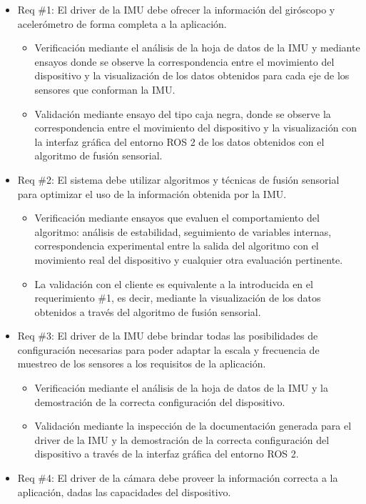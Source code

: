 \documentclass[
11pt, %
codirector, %
]{charter}
\begin{document}
\begin{itemize}
	\item Req \#1: El driver de la IMU debe ofrecer la información del giróscopo y acelerómetro de forma completa a la aplicación.
	\begin{itemize}
		\item Verificación mediante el análisis de la hoja de datos de la IMU y mediante ensayos donde se observe la correspondencia entre el movimiento del dispositivo y la visualización de los datos obtenidos para cada eje de los sensores que conforman la IMU.
		\item Validación mediante ensayo del tipo caja negra, donde se observe la correspondencia entre el movimiento del dispositivo y la visualización con la interfaz gráfica del entorno ROS 2 de los datos obtenidos con el algoritmo de fusión sensorial.
	\end{itemize}
	\item Req \#2: El sistema debe utilizar algoritmos y técnicas de fusión sensorial para optimizar el uso de la información obtenida por la IMU.
	\begin{itemize}
		\item Verificación mediante ensayos que evaluen el comportamiento del algoritmo: análisis de estabilidad, seguimiento de variables internas, correspondencia experimental entre la salida del algoritmo con el movimiento real del dispositivo y cualquier otra evaluación pertinente.
		\item La validación con el cliente es equivalente a la introducida en el requerimiento \#1, es decir, mediante la visualización de los datos obtenidos a través del algoritmo de fusión sensorial.
	\end{itemize}
	\item Req \#3: El driver de la IMU debe brindar todas las posibilidades de configuración necesarias para poder adaptar la escala y frecuencia de muestreo de los sensores a los requisitos de la aplicación.
	\begin{itemize}
		\item Verificación mediante el análisis de la hoja de datos de la IMU y la demostración de la correcta configuración del dispositivo.
		\item Validación mediante la inspección de la documentación generada para el driver de la IMU y la demostración de la correcta configuración del dispositivo a través de la interfaz gráfica del entorno ROS 2.
	\end{itemize}
	\item Req \#4: El driver de la cámara debe proveer la información correcta a la aplicación, dadas las capacidades del dispositivo.

\end{itemize}
\end{document}
